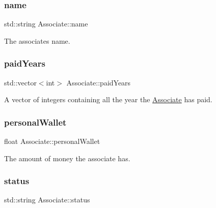 \subsubsection{\texorpdfstring{name}{name}}
{\footnotesize\ttfamily std\+::string Associate\+::name\hspace{0.3cm}{\ttfamily [private]}}



The associate\textquotesingle{}s name. 

\mbox{\label{classAssociate_ad7d373d77a5c49eb845e89729962c30d}} 
\subsubsection{\texorpdfstring{paid\+Years}{paidYears}}
{\footnotesize\ttfamily std\+::vector$<$int$>$ Associate\+::paid\+Years\hspace{0.3cm}{\ttfamily [private]}}



A vector of integers containing all the year the \mbox{\hyperlink{classAssociate}{Associate}} has paid. 

\mbox{\label{classAssociate_adc7e2decb409cd226e1508c1c5df3b90}} 
\subsubsection{\texorpdfstring{personal\+Wallet}{personalWallet}}
{\footnotesize\ttfamily float Associate\+::personal\+Wallet\hspace{0.3cm}{\ttfamily [private]}}



The amount of money the associate has. 

\mbox{\label{classAssociate_aacf79a4e389c7db3d8636b788cb2089f}} 
\subsubsection{\texorpdfstring{status}{status}}
{\footnotesize\ttfamily std\+::string Associate\+::status\hspace{0.3cm}{\ttfamily [private]}}



